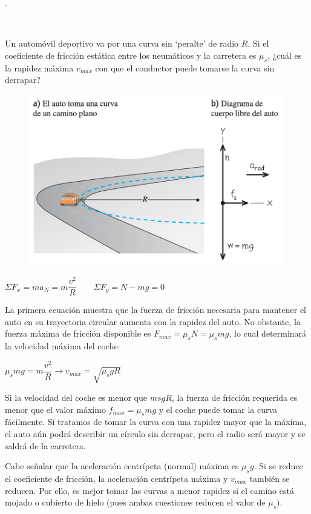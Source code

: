 \begin{prob}.

\begin{multicols}{2}
$\quad$

Un automóvil deportivo va por una curva sin `peralte' de radio $R$. Si el coeficiente de fricción estática entre los neumáticos y la carretera es $\mu_s$, ¿cuál es la rapidez máxima $v_{max}$ con que el conductor puede tomarse la curva sin derrapar?	
\begin{figure}[H]
	\centering
	\includegraphics[width=.5\textwidth]{imagenes/imagenes03/T03IM44.png}
	\end{figure}
\end{multicols}
\end{prob}

$\Sigma F_x= m a_N = m \dfrac {v^2}{R} \quad \quad  \Sigma F_y=N-mg=0
  $
 
 La primera ecuación muestra que la fuerza de fricción necesaria para mantener el auto en su trayectoria circular aumenta con la rapidez del auto. No obstante, la fuerza máxima de fricción disponible es
 $F_{max}=\mu_s N =\mu_s m g$, lo cual determinará la velocidad máxima del coche:
 
 $\mu_s m g= m \dfrac {v^2}{R} \to v_{max}=\sqrt{\mu_s g R}$
 
 \small{\textsf{Si la velocidad del coche es menor que $msgR$, la fuerza de fricción requerida es menor que el valor máximo $f_{max} = \mu_s m g$ y el coche puede tomar la curva fácilmente. Si tratamos de tomar la curva con una rapidez mayor que la máxima, el auto aún podrá describir un círculo sin derrapar, pero el radio será mayor y se saldrá de la carretera.}}
 
 \small{\textsf{Cabe señalar que la aceleración centrípeta (normal) máxima es $\mu_s g$. Si se reduce el coeficiente de fricción, la aceleración centrípeta máxima y $v_{max}$ también se reducen. Por ello, es mejor tomar las curvas a menor rapidez si el camino está mojado o cubierto de hielo (pues ambas cuestiones reducen el valor de $\mu_s$)}}\normalsize{.}
 

